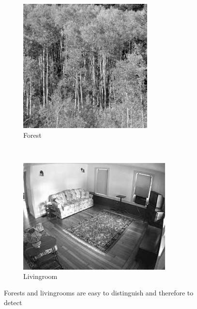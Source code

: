 \documentclass[subfigure,epsfig,fleqn,float,numbers=noenddot]{scrartcl}
\begin{document}
\begin{figure}%
	\centering
	\begin{subfigure}[b]{0.4\textwidth}
					\includegraphics[width=\textwidth]{img/forest_easy}
					\caption{Forest}
					\label{fig:foresteasy}
	\end{subfigure}%
	~ %
	\begin{subfigure}[b]{0.4\textwidth}
					\includegraphics[width=\textwidth]{img/livingroom_hard}
					\caption{Livingroom}
					\label{fig:livingroomeasy}
	\end{subfigure}
	\caption{Forests and livingrooms are easy to distinguish and therefore to detect}
	\label{fig:easyimages}
\end{figure}
\end{document}
